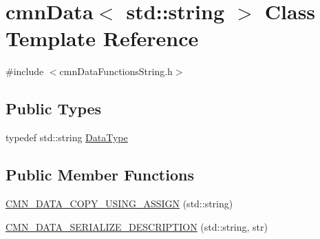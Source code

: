 \hypertarget{classcmn_data_3_01std_1_1string_01_4}{}\section{cmn\+Data$<$ std\+:\+:string $>$ Class Template Reference}
\label{classcmn_data_3_01std_1_1string_01_4}


{\ttfamily \#include $<$cmn\+Data\+Functions\+String.\+h$>$}

\subsection*{Public Types}
\begin{DoxyCompactItemize}
\item 
typedef std\+::string \hyperlink{classcmn_data_3_01std_1_1string_01_4_a04ffa92a93dc010ed2bf5bf19e2d0fdd}{Data\+Type}
\end{DoxyCompactItemize}
\subsection*{Public Member Functions}
\begin{DoxyCompactItemize}
\item 
\hyperlink{classcmn_data_3_01std_1_1string_01_4_ac1018675a2e4cb7fb35c16f063ca72fa}{C\+M\+N\+\_\+\+D\+A\+T\+A\+\_\+\+C\+O\+P\+Y\+\_\+\+U\+S\+I\+N\+G\+\_\+\+A\+S\+S\+I\+G\+N} (std\+::string)
\item 
\hyperlink{classcmn_data_3_01std_1_1string_01_4_a7206cb10c06ff9bd89ed090c861b8655}{C\+M\+N\+\_\+\+D\+A\+T\+A\+\_\+\+S\+E\+R\+I\+A\+L\+I\+Z\+E\+\_\+\+D\+E\+S\+C\+R\+I\+P\+T\+I\+O\+N} (std\+::string, str)
\end{DoxyCompactItemize}

